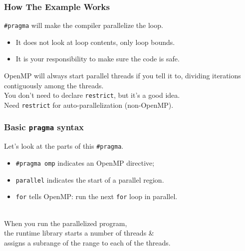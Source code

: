 \begin{frame}[containsverbatim]
  \frametitle{How The Example Works}

\large
  
    \verb+#pragma+ will make the compiler parallelize the loop.

  \begin{itemize}
    \item It does not look at loop contents, only loop bounds.
    \item \alert{It is your responsibility to make sure the code is safe.}
  \end{itemize}
  \vfill
  OpenMP will always start parallel threads if you tell it to, dividing
  iterations contiguously among the threads.\\[1em]

  You don't need to declare {\tt restrict}, but it's a good idea.\\
  Need {\tt restrict} for auto-parallelization (non-OpenMP).
  

\end{frame}

\begin{frame}[containsverbatim]
  \frametitle{Basic {\tt pragma} syntax}

  
  Let's look at the parts of this \verb+#pragma+.\\[1em]

  \begin{itemize}
    \item \verb+#pragma omp+ indicates an OpenMP directive;
    \vfill
    \item {\tt parallel} indicates the start of a parallel region.
    \vfill
    \item {\tt for} tells OpenMP: run the next {\tt for} loop in parallel.
  \end{itemize}
  ~\\[1em]

  When you run the parallelized program, \\ the runtime library starts
  a number of threads \& \\  assigns a subrange of the range to 
  each of the threads.
  

\end{frame}

